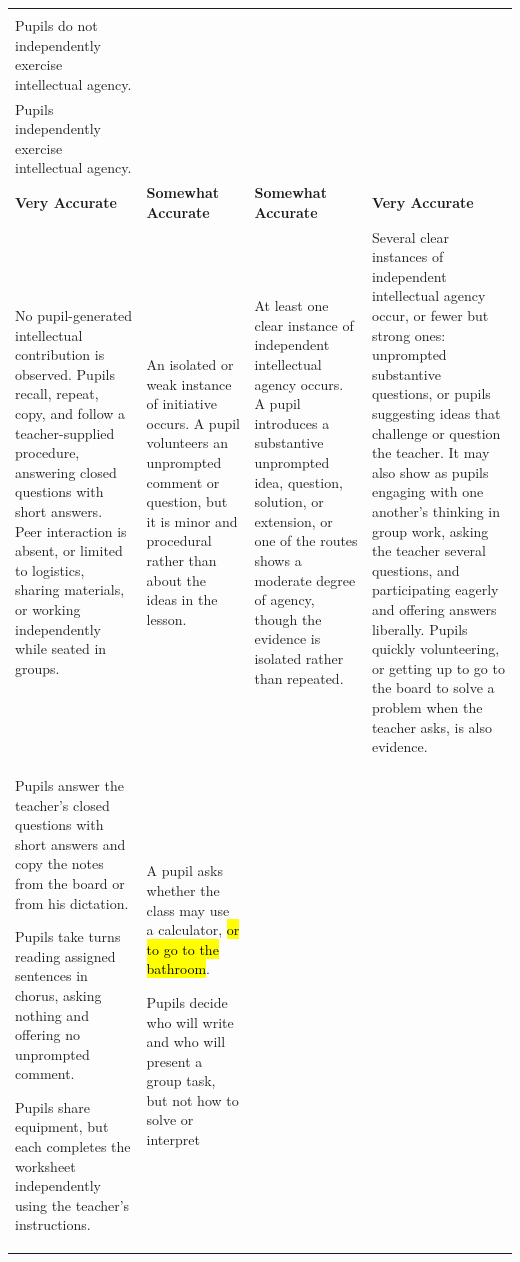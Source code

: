 \documentclass[10pt,a4paper]{article}
\makeatletter
\newcommand{\exlistsize}{\scriptsize}
\renewcommand{\arraystretch}{1.25}
\newlength{\gridw}\newlength{\stemw}\newlength{\stemh}\newlength{\stemtop}
\newcommand{\stemrow}[2]{%
  \setlength{\stemtop}{1.15\ht\strutbox}%
  \setlength{\stemw}{0.5\dimexpr\gridw-2\arrayrulewidth\relax}%
  \sbox{\stemAbox}{\begin{minipage}[t]{\dimexpr\stemw-4.4mm\relax}\RaggedRight
      \footnotesize\textbf{Column A}\\#1\end{minipage}}%
  \sbox{\stemBbox}{\begin{minipage}[t]{\dimexpr\stemw-4.4mm\relax}\RaggedRight
      \footnotesize\textbf{Column B}\\#2\end{minipage}}%
  \setlength{\stemh}{\dimexpr\ht\stemAbox+\dp\stemAbox\relax}%
  \ifdim\dimexpr\ht\stemBbox+\dp\stemBbox\relax>\stemh
    \setlength{\stemh}{\dimexpr\ht\stemBbox+\dp\stemBbox\relax}\fi
  \setlength{\stemh}{\dimexpr\stemtop+\stemh+2.6mm\relax}%
  \begin{tikzpicture}[inner sep=0pt,outer sep=0pt,baseline=0pt]
    \shade[left color=gradA,middle color=gradM,right color=gradB]
      (0,\stemtop) rectangle (\dimexpr\gridw-2\arrayrulewidth\relax,
                              \dimexpr\stemtop-\stemh\relax);
    \draw[black,line width=\arrayrulewidth]
      (\stemw,\stemtop) -- (\stemw,\dimexpr\stemtop-\stemh\relax);
    \node[anchor=north west] at (2.2mm,\dimexpr\stemtop-1.2mm\relax)
      {\usebox{\stemAbox}};
    \node[anchor=north west] at (\dimexpr\stemw+2.2mm\relax,
                                 \dimexpr\stemtop-1.2mm\relax)
      {\usebox{\stemBbox}};
  \end{tikzpicture}}
\newcommand{\scoregrid}[4]{%
  \setlength{\gridw}{\linewidth}%
  \renewcommand{\arraystretch}{1.06}%
  \noindent\footnotesize
  \begin{tabularx}{\linewidth}{|>{\RaggedRight\arraybackslash}X
                               |>{\RaggedRight\arraybackslash}X
                               |>{\RaggedRight\arraybackslash}X
                               |>{\RaggedRight\arraybackslash}X|}
  \hline
  \multicolumn{4}{|@{}l@{}|}{\stemrow{#1}{#2}}\\
  \hline
  \rowcolor{tsub}
  \centering\arraybackslash\textbf{Very Accurate} &
  \centering\arraybackslash\textbf{Somewhat Accurate} &
  \centering\arraybackslash\textbf{Somewhat Accurate} &
  \centering\arraybackslash\textbf{Very Accurate}\\
  \hline
  #3\\
  \hline
  \rowcolor{texfill} #4\\
  \hline
  \end{tabularx}\normalsize}
\makeatother
\begin{document}
\scoregrid{Pupils do not independently exercise intellectual agency.}%
          {Pupils independently exercise intellectual agency.}{%
\footnotesize No pupil-generated intellectual contribution is observed. Pupils recall, repeat, copy, and
follow a teacher-supplied procedure, answering closed questions with short answers. Peer interaction is
absent, or limited to logistics, sharing materials, or working independently while seated in groups. &
\footnotesize An isolated or weak instance of initiative occurs. A pupil volunteers an unprompted comment or
question, but it is minor and procedural rather than about the ideas in the lesson. &
\footnotesize At least one clear instance of independent intellectual agency occurs. A pupil introduces a
substantive unprompted idea, question, solution, or extension, or one of the routes shows a moderate degree
of agency, though the evidence is isolated rather than repeated. &
\footnotesize Several clear instances of independent intellectual agency occur, or fewer but strong ones:
unprompted substantive questions, or pupils suggesting ideas that challenge or question the teacher. It may
also show as pupils engaging with one another's thinking in group work, asking the teacher several
questions, and participating eagerly and offering answers liberally. Pupils quickly volunteering, or getting
up to go to the board to solve a problem when the teacher asks, is also evidence.
}{%
\exlistsize\begin{exlist}
  \item Pupils answer the teacher's closed questions with short answers and copy the notes from the board or
        from his dictation.
  \item Pupils take turns reading assigned sentences in chorus, asking nothing and offering no unprompted
        comment.
  \item Pupils share equipment, but each completes the worksheet independently using the teacher's
        instructions.
\end{exlist} &
\exlistsize\begin{exlist}
  \item A pupil asks whether the class may use a calculator, \hl{or to go to the bathroom}. %
  \item Pupils decide who will write and who will present a group task, but not how to solve or interpret

\end{exlist}}
\end{document}
